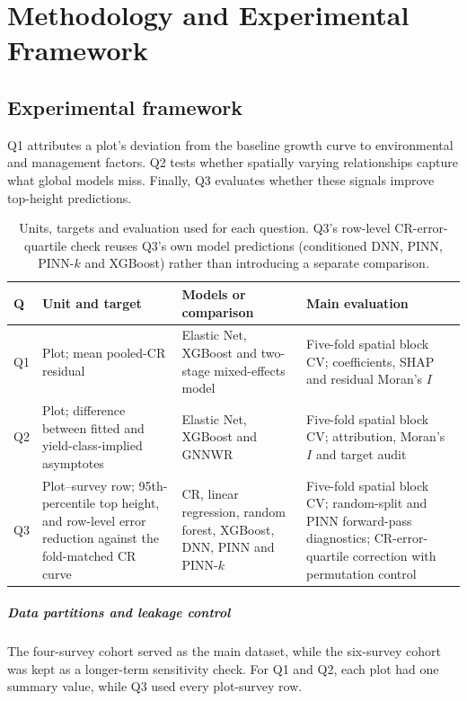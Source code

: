 \chapter{Methodology and Experimental Framework} \label{ch:methodology}
\section{Experimental framework}
Q1 attributes a plot's deviation from the baseline growth curve to environmental and management factors. Q2 tests whether spatially varying relationships capture what global models miss. Finally, Q3 evaluates whether these signals improve top-height predictions.

\begin{table}[!ht]
\centering
\footnotesize
\renewcommand{\arraystretch}{1.15}
\begin{tabularx}{\linewidth}{@{} l >{\raggedright\arraybackslash}X >{\raggedright\arraybackslash}X >{\raggedright\arraybackslash}X @{}}
\toprule
Q & Unit and target & Models or comparison & Main evaluation \\
\midrule
Q1 & Plot; mean pooled-CR residual & Elastic Net, XGBoost and two-stage
mixed-effects model & Five-fold spatial block CV; coefficients, SHAP and residual Moran's $I$ \\
Q2 & Plot; difference between fitted and yield-class-implied asymptotes & Elastic Net, XGBoost
and GNNWR & Five-fold spatial block CV; attribution, Moran's $I$ and target audit \\
Q3 & Plot--survey row; 95th-percentile top height, and row-level error reduction against the
fold-matched CR curve & CR, linear regression, random forest, XGBoost, DNN, PINN and PINN-$k$
& Five-fold spatial block CV; random-split and PINN forward-pass diagnostics; CR-error-quartile
correction with permutation control \\
\bottomrule
\end{tabularx}
\caption{\small{Units, targets and evaluation used for each question. Q3's row-level CR-error-quartile
check reuses Q3's own model predictions (conditioned DNN, PINN, PINN-$k$ and XGBoost) rather
than introducing a separate comparison.}}
\label{tab:rq-framework}
\end{table}

\paragraph*{Data partitions and leakage control}
The four-survey cohort served as the main dataset, while the six-survey cohort was kept as a longer-term sensitivity check. For Q1 and Q2, each plot had one summary value, while Q3 used every plot-survey row.

